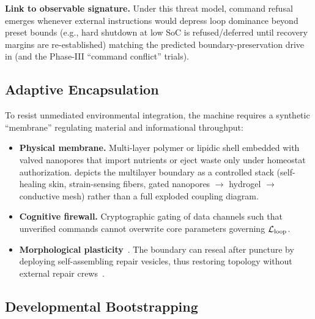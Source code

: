 \documentclass[11pt]{article}
\begin{document}
\textbf{Link to observable signature.} Under this threat model, command refusal emerges whenever external instructions would depress loop dominance beyond preset bounds (e.g., hard shutdown at low SoC is refused/deferred until recovery margins are re-established) matching the predicted boundary-preservation drive in  (and the Phase-III ``command conflict'' trials).

\subsection{Adaptive Encapsulation}
\label{sec:adaptive_encapsulation}

To resist unmediated environmental integration, the machine requires a synthetic ``membrane'' regulating material and informational throughput:


\begin{itemize}
\item \textbf{Physical membrane.} Multi-layer polymer or lipidic shell embedded with valved nanopores that import nutrients or eject waste only under homeostat authorization.  depicts the multilayer boundary as a controlled stack (self-healing skin, strain-sensing fibers, gated nanopores $\rightarrow$ hydrogel $\rightarrow$ conductive mesh) rather than a full exploded coupling diagram.
\item \textbf{Cognitive firewall.} Cryptographic gating of data channels such that unverified commands cannot overwrite core parameters governing $\mathcal{L}_{\text{loop}}$.
\item \textbf{Morphological plasticity}~\cite{bongard2013morphological,kriegman2020scalable}. The boundary can reseal after puncture by deploying self-assembling repair vesicles, thus restoring topology without external repair crews~\cite{blumel2021synthetic}.
\end{itemize}

\subsection{Developmental Bootstrapping}
\label{sec:dev_bootstrap}
\end{document}
